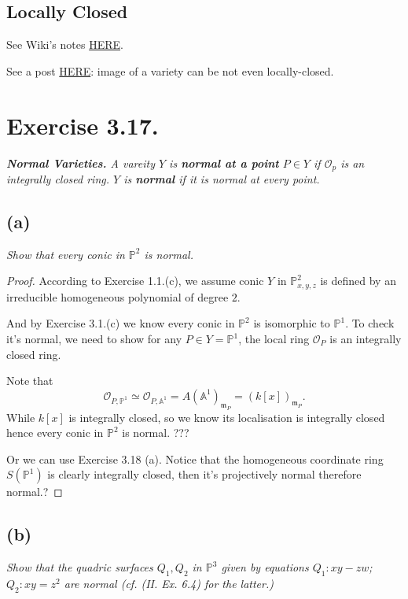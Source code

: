 \subsection{Locally Closed} 

See Wiki's notes \href{https://en.wikipedia.org/wiki/Locally_closed_subset}{HERE}. 

See a post \href{https://math.stackexchange.com/questions/341665/image-of-a-morphism-of-varieties}{HERE}: image of a variety can be not even locally-closed.

\section{Exercise 3.17.}
\textit{\textbf{Normal Varieties.} A vareity $Y$ is \textbf{normal at a point} $P\in Y$ if $\mathscr O_p$ is an integrally closed ring. $Y$ is \textbf{normal} if it is normal at every point.}

\subsection{(a)}\textit{Show that every conic in $\mathbb P^2$ is normal.}

\begin{proof}
According to Exercise 1.1.(c), we assume conic $Y$ in $\mathbb P^2_{x,y,z}$ is defined by an irreducible homogeneous polynomial of degree $2$. 

And by Exercise 3.1.(c) we know every conic in $\mathbb P^2$ is isomorphic to $\mathbb P^1$. To check it's normal, we need to show for any $P\in Y=\mathbb P^1$, the local ring $\mathscr O_P$ is an integrally closed ring. 

Note that
\[\mathscr O_{P,\mathbb P^1}\simeq \mathscr O_{P,\mathbb A^1}=A(\mathbb A^1)_{\mathfrak m_P}=(k[x])_{\mathfrak m_P}.\] While $k[x]$ is integrally closed, so we know its localisation is integrally closed hence every conic in $\mathbb P^2$ is normal. ???

Or we can use Exercise 3.18 (a). Notice that the homogeneous coordinate ring $S(\mathbb P^1)$ is clearly integrally closed, then it's projectively normal therefore normal.?

\end{proof}

\subsection{(b)}
\textit{Show that the quadric surfaces $Q_1,Q_2$ in $\mathbb P^3$ given by equations $Q_1: xy-zw$; $Q_2:xy=z^2$ are normal (cf. (II. Ex. 6.4) for the latter.)}

